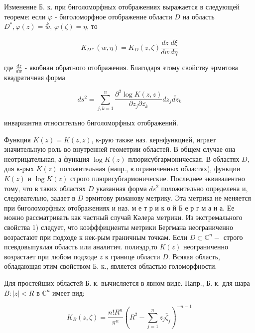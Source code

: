 \documentclass[10pt]{article}
\begin{document}
Изменение Б. к. при биголоморфных отображениях выражается в следующей теореме: если $\varphi$ - биголоморфное отображение области $D$ на область $D^{*}, \varphi(z)=\stackrel{k}{w}$, $\varphi(\zeta)=\eta$, то



\[

K_{D *}(w, \eta)=K_{D}(z, \zeta) \frac{d z}{d w} \frac{\overline{d \xi}}{d \eta}

\]



где $\frac{d z}{d w}$ - якобиан обратного отображения. Благодаря этому свойству эрмитова квадратичная форма



\[

d s^{2}=\sum_{j, k=1}^{n} \frac{\partial^{2} \log K(z, z)}{\partial z_{j} \partial \overline{z_{k}}} d z_{j} \overline{d z}_{k}

\]



инвариантна относительно биголоморфных отображений.



Функция $K(z)=K(z, z)$, к-рую также наз. кернфункцией, играет значительную роль во внутренней геометрии областей. В общем случае она неотрицательная, а функция $\log K(z)$ плюрисубгармоническая. В областях $D$, для к-рых $K(z)$ положительная (напр., в ограниченных областях), функции $K(z)$ и $\log K(z)$ строго плюрисубгармонические. Последнее эквивалентно тому, что в таких областях $D$ указанная форма $d s^{2}$ положительно определена и, следовательно, задает в $D$ эрмитову риманову метрику. Эта метрика не меняется при биголоморфных отображениях и наз. м е т р и к о й Б е р г м а н а. Ее можно рассматривать как частный случай Кәлера метрики. Из экстремального свойства 1) следует, что коэфффициенты метрики Бергмана неограниченно возрастают при подходе к нек-рым граничным точкам. Если $D \subset \mathbb{C}^{n}-$ строго псевдовыпуклая область или аналитич. полиэдр,то $K(z)$ неограниченно возрастает при любом подходе $z$ к границе области $D$. Всякая область, обладающая этим свойством Б. к., является областью голоморфности.



Для простейших областей Б. к. вычисляется в явном виде. Напр., Б. к. для шара $B:|z|<R$ в $\mathbb{C}^{n}$ имеет вид:



\[

K_{B}(z, \zeta)=\frac{n ! R^{n}}{\pi^{n}}\left(R^{2}-\sum_{j=1}^{n} z_{j} \bar{\zeta}_{j}\right)^{-n-1}

\]
\end{document}
